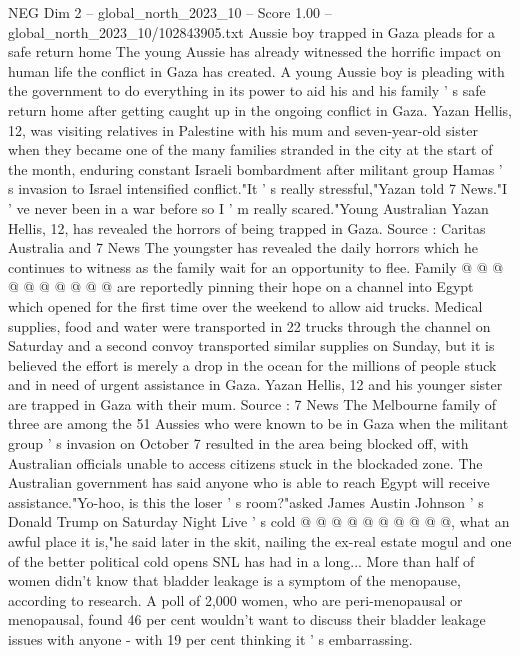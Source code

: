 \begin{textsample}{NEG Dim 2 – global\_north\_2023\_10 – Score 1.00 – global\_north\_2023\_10/102843905.txt}  \label{ex:f2_neg_296}
Aussie boy trapped in Gaza pleads for a safe return home The young Aussie has already witnessed the horrific impact on human life the conflict in Gaza has created.
A young Aussie boy is pleading with the government to do everything in its power to aid his and his family ' s safe return home after getting caught up in the ongoing conflict in Gaza.
Yazan Hellis, 12, was visiting relatives in Palestine with his mum and seven-year-old sister when they became one of the many families stranded in the city at the start of the month, enduring constant Israeli bombardment after militant group Hamas ' s invasion to Israel intensified conflict."It ' s really stressful,"Yazan told 7 News."I ' ve never been in a war before so I ' m really scared."Young Australian Yazan Hellis, 12, has revealed the horrors of being trapped in Gaza.
Source : Caritas Australia and 7 News The youngster has revealed the daily horrors which he continues to witness as the family wait for an opportunity to flee.
Family @ @ @ @ @ @ @ @ @ @ are reportedly pinning their hope on a channel into Egypt which opened for the first time over the weekend to allow aid trucks.
Medical supplies, food and water were transported in 22 trucks through the channel on Saturday and a second convoy transported similar supplies on Sunday, but it is believed the effort is merely a drop in the ocean for the millions of people stuck and in need of urgent assistance in Gaza.
Yazan Hellis, 12 and his younger sister are trapped in Gaza with their mum.
Source : 7 News The Melbourne family of three are among the 51 Aussies who were known to be in Gaza when the militant group ' s invasion on October 7 resulted in the area being blocked off, with Australian officials unable to access citizens stuck in the blockaded zone.
The Australian government has said anyone who is able to reach Egypt will receive assistance."Yo-hoo, is this the loser ' s room?"asked James Austin Johnson ' s Donald Trump on Saturday Night Live ' s cold @ @ @ @ @ @ @ @ @ @, what an awful place it is,"he said later in the skit, nailing the ex-real estate mogul and one of the better political cold opens SNL has had in a long...
More than half of women didn't know that bladder leakage is a symptom of the menopause, according to research.
A poll of 2,000 women, who are peri-menopausal or menopausal, found 46 per cent wouldn't want to discuss their bladder leakage issues with anyone - with 19 per cent thinking it ' s embarrassing.

\end{textsample}
